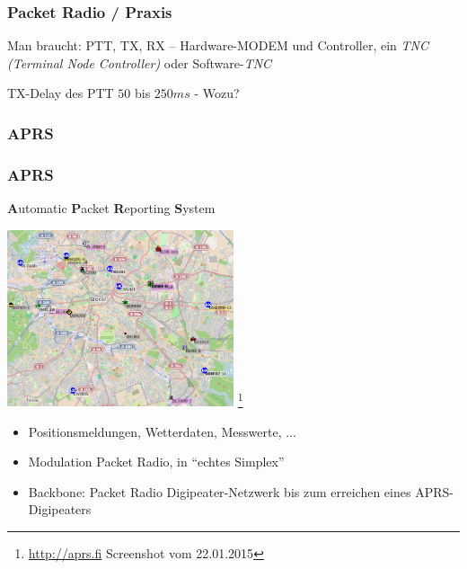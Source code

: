 \begin{frame}
    \frametitle{Packet Radio / Praxis}

    Man braucht: PTT, TX, RX -- Hardware-MODEM und Controller, ein \emph{TNC
    (Terminal Node Controller)} oder Software-\emph{TNC} \\[2em]


    \begin{block}{TX-Delay des PTT $50$ bis $250ms$ - Wozu?}
    \end{block}

\end{frame}

\subsubsection{APRS}

\begin{frame}
    \frametitle{APRS}

    \textbf{A}utomatic \textbf{P}acket \textbf{R}eporting \textbf{S}ystem

    \begin{center}
        \includegraphics[width=0.5\textwidth,height=.4\textheight,keepaspectratio]{e16/APRS.png}
        \footnote{\url{http://aprs.fi} Screenshot vom 22.01.2015}
    \end{center}

    \begin{itemize}
        \item Positionsmeldungen, Wetterdaten, Messwerte, ...
        \item Modulation Packet Radio, in ``echtes Simplex''
        \item Backbone: Packet Radio Digipeater-Netzwerk bis zum erreichen eines
              APRS-Digipeaters
    \end{itemize}

\end{frame}

